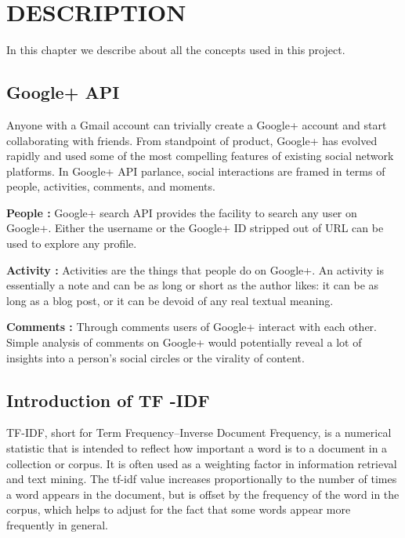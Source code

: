 \documentclass{mnnit}
\begin{document}
\chapter{DESCRIPTION}
In this chapter we describe about all the concepts used in this project.

\section{Google+ API }
Anyone with a Gmail account can trivially create a Google+ account and start collaborating
with friends. From standpoint of product, Google+ has evolved rapidly and used some of the most compelling features of existing social network platforms. In Google+ API parlance, social interactions are framed in terms of people, activities, comments, and moments\cite{boole}.

\vspace{2 mm}

\noindent \textbf{People :}
Google+ search API provides the facility to search any user on Google+. Either the username or the Google+ ID stripped out of URL can be used to explore any profile.

\vspace{2 mm}

\noindent \textbf{Activity :}
Activities are the things that people do on Google+.  An activity is essentially a note and can be as long or short as the author likes: it can be as long as a blog post, or it can be devoid of any real textual meaning.

\vspace{2 mm}

\noindent \textbf{Comments :}
Through comments users of Google+ interact with each other. Simple analysis of comments on Google+ would potentially reveal a lot of insights into a person’s social circles or the virality of content.

\section{Introduction of TF -IDF }
TF-IDF, short for Term Frequency–Inverse Document Frequency, is a numerical statistic that is intended to reflect how important a word is to a document in a collection or corpus. It is often used as a weighting factor in information retrieval and text mining. The tf-idf value increases proportionally to the number of times a word appears in the document, but is offset by the frequency of the word in the corpus, which helps to adjust for the fact that some words appear more frequently in general.
\end{document}
